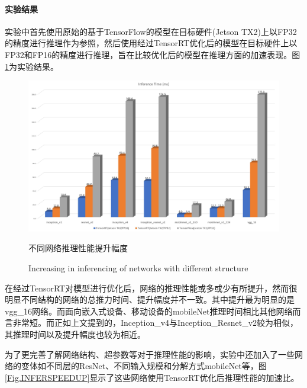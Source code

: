 \paragraph{实验结果}
\par 实验中首先使用原始的基于TensorFlow的模型在目标硬件(Jetson TX2)上以FP32的精度进行推理作为参照，然后使用经过TensorRT优化后的模型在目标硬件上以FP32和FP16的精度进行推理，旨在比较优化后的模型在推理方面的加速表现。图 \ref{Fig.INFER}为实验结果。
\begin{figure}
	\centering
	\includegraphics[width=15cm]{figures/TENSORRTRES.jpg}
	\renewcommand{\thefigure}{\arabic{section}-\arabic{figure} }
	\renewcommand{\figurename}{图}
	\caption{不同网络推理性能提升幅度}
	\addtocounter{figure}{-1}
	\renewcommand{\thefigure}{\arabic{section}-\arabic{figure} }
	\renewcommand{\figurename}{Figure}
	\caption{Increasing in inferencing of networks with different structure}
	\label{Fig.INFER}
\end{figure}
\par 在经过TensorRT对模型进行优化后，网络的推理性能或多或少有所提升，然而很明显不同结构的网络的总推力时间、提升幅度并不一致。其中提升最为明显的是vgg\_16网络。而面向嵌入式设备、移动设备的mobileNet推理时间相比其他网络而言非常短。而正如上文提到的，Inception\_v4与Inception\_Resnet\_v2较为相似，其推理时间以及提升幅度也较为相近。
\par 为了更完善了解网络结构、超参数等对于推理性能的影响，实验中还加入了一些网络的变体如不同层的ResNet、不同输入规模和分解方式mobileNet等，图 \ref{Fig.INFERSPEEDUP}显示了这些网络使用TensorRT优化后推理性能的加速比。
